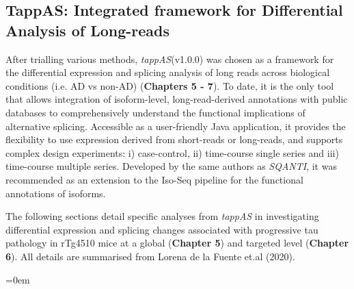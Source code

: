 \subsection{TappAS: Integrated framework for Differential Analysis of Long-reads}
After trialling various methods, \textit{tappAS}(v1.0.0)\cite{DeLaFuente2020} was chosen as a framework for the differential expression and splicing analysis of long reads across biological conditions (i.e. AD vs non-AD) (\textbf{Chapters 5 - 7}). To date, it is the only tool that allows integration of isoform-level, long-read-derived annotations with public databases to comprehensively understand the functional implications of alternative splicing. Accessible as a user-friendly Java application, it provides the flexibility to use expression derived from short-reads or long-reads, and supports complex design experiments: i) case-control, ii) time-course single series and iii) time-course multiple series. Developed by the same authors as \textit{SQANTI}\cite{Tardaguila2018}, it was recommended as an extension to the Iso-Seq pipeline for the functional annotations of isoforms.    

The following sections detail specific analyses from \textit{tappAS} in investigating differential expression and splicing changes associated with progressive tau pathology in rTg4510 mice at a global (\textbf{Chapter 5}) and targeted level (\textbf{Chapter 6}). All details are summarised from Lorena de la Fuente et.al (2020)\cite{DeLaFuente2020}.

\vspace{2cm}
\begingroup
\parindent=0em
\localtableofcontents 
\endgroup


